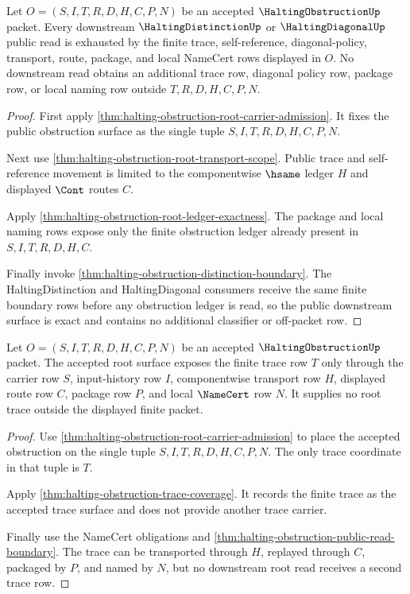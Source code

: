 \begin{theorem}
\label{thm:halting-obstruction-public-downstream-exactness}
Let $O=(S,I,T,R,D,H,C,P,N)$ be an accepted $\HaltingObstructionUp$ packet. Every downstream $\HaltingDistinctionUp$ or $\HaltingDiagonalUp$ public read is exhausted by the finite trace, self-reference, diagonal-policy, transport, route, package, and local NameCert rows displayed in $O$. No downstream read obtains an additional trace row, diagonal policy row, package row, or local naming row outside $T,R,D,H,C,P,N$.
\end{theorem}
\begin{proof}
First apply \autoref{thm:halting-obstruction-root-carrier-admission}. It fixes the public obstruction surface as the single tuple $S,I,T,R,D,H,C,P,N$.

Next use \autoref{thm:halting-obstruction-root-transport-scope}. Public trace and self-reference movement is limited to the componentwise $\hsame$ ledger $H$ and displayed $\Cont$ routes $C$.

Apply \autoref{thm:halting-obstruction-root-ledger-exactness}. The package and local naming rows expose only the finite obstruction ledger already present in $S,I,T,R,D,H,C$.

Finally invoke \autoref{thm:halting-obstruction-distinction-boundary}. The HaltingDistinction and HaltingDiagonal consumers receive the same finite boundary rows before any obstruction ledger is read, so the public downstream surface is exact and contains no additional classifier or off-packet row.
\end{proof}

\begin{theorem}
\label{thm:halting-obstruction-root-trace-admission}
Let $O=(S,I,T,R,D,H,C,P,N)$ be an accepted $\HaltingObstructionUp$ packet. The accepted root surface exposes the finite trace row $T$ only through the carrier row $S$, input-history row $I$, componentwise transport row $H$, displayed route row $C$, package row $P$, and local $\NameCert$ row $N$. It supplies no root trace outside the displayed finite packet.
\end{theorem}
\begin{proof}
Use \autoref{thm:halting-obstruction-root-carrier-admission} to place the accepted obstruction on the single tuple $S,I,T,R,D,H,C,P,N$. The only trace coordinate in that tuple is $T$.

Apply \autoref{thm:halting-obstruction-trace-coverage}. It records the finite trace as the accepted trace surface and does not provide another trace carrier.

Finally use the NameCert obligations and \autoref{thm:halting-obstruction-public-read-boundary}. The trace can be transported through $H$, replayed through $C$, packaged by $P$, and named by $N$, but no downstream root read receives a second trace row.
\end{proof}

